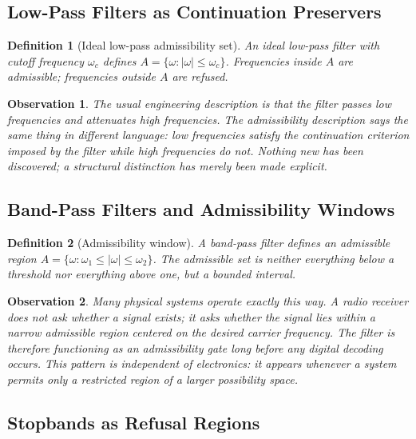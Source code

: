 \documentclass[12pt]{article}
\newtheorem{definition}{Definition}
\newtheorem{observation}{Observation}
\begin{document}
\subsection{Low-Pass Filters as Continuation Preservers}

\begin{definition}[Ideal low-pass admissibility set]
An ideal low-pass filter with cutoff frequency $\omega_c$ defines $A=\{\omega : |\omega| \le \omega_c\}$. Frequencies inside $A$ are admissible; frequencies outside $A$ are refused.
\end{definition}

\begin{observation}
The usual engineering description is that the filter passes low frequencies and attenuates high frequencies. The admissibility description says the same thing in different language: low frequencies satisfy the continuation criterion imposed by the filter while high frequencies do not. Nothing new has been discovered; a structural distinction has merely been made explicit.
\end{observation}

\subsection{Band-Pass Filters and Admissibility Windows}

\begin{definition}[Admissibility window]
A band-pass filter defines an admissible region $A=\{\omega : \omega_1 \le |\omega| \le \omega_2\}$. The admissible set is neither everything below a threshold nor everything above one, but a bounded interval.
\end{definition}

\begin{observation}
Many physical systems operate exactly this way. A radio receiver does not ask whether a signal exists; it asks whether the signal lies within a narrow admissible region centered on the desired carrier frequency. The filter is therefore functioning as an admissibility gate long before any digital decoding occurs. This pattern is independent of electronics: it appears whenever a system permits only a restricted region of a larger possibility space.
\end{observation}

\subsection{Stopbands as Refusal Regions}
\end{document}
